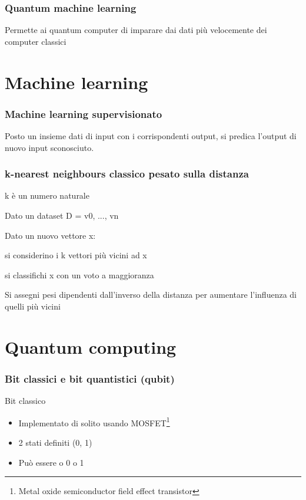 \documentclass{beamer}
\begin{document}
	\begin{frame}
		\frametitle{Quantum machine learning}
	
		Permette ai quantum computer di imparare dai dati più velocemente dei computer classici
	
	\end{frame}

	\section{Machine learning}

	\begin{frame}
		\frametitle{Machine learning supervisionato}
	
		Posto un insieme dati di input con i corrispondenti output, 
		si predica l'output di nuovo input sconosciuto. 
	
	\end{frame}

	\begin{frame}
		\frametitle{k-nearest neighbours classico pesato sulla distanza}
	
		k è un numero naturale

		Dato un dataset D = v0, ..., vn

		Dato un nuovo vettore x: 

		si considerino i k vettori più vicini ad x 

		si classifichi x con un voto a maggioranza 

		Si assegni pesi dipendenti dall'inverso della distanza per 
		aumentare l'influenza di quelli più vicini
	
	\end{frame}

	\section{Quantum computing}

	\begin{frame}
		\frametitle{Bit classici e bit quantistici (qubit)}
	

		Bit classico

		\begin{itemize}
			\item Implementato di solito usando MOSFET\footnote{Metal oxide semiconductor field effect transistor}
			\item 2 stati definiti (0, 1)
			\item Può essere o 0 o 1
		\end{itemize}
	
	\end{frame}
\end{document}
